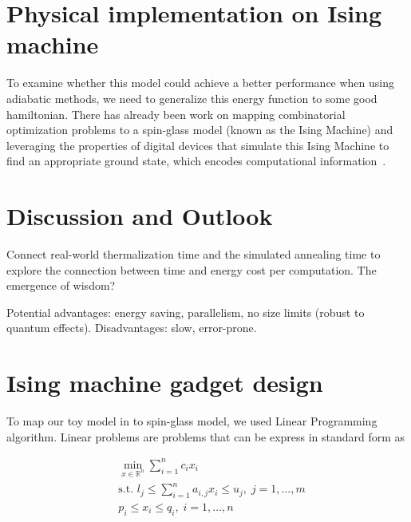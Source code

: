\documentclass[twocolumn,superscriptaddress,english,showpacs,longbibliography]{revtex4-2}
\begin{document}
\section{Physical implementation on Ising machine}\label{spin-glass}

To examine whether this model could achieve a better performance when
using adiabatic methods, we need to generalize this energy function to
some good hamiltonian. There has already been work on mapping
combinatorial optimization problems to a spin-glass model (known as the
Ising Machine) and leveraging the properties of digital devices that
simulate this Ising Machine to find an appropriate ground state, which
encodes computational information~\cite{Aadit2022,Bybee2023}.



\section{Discussion and Outlook}
Connect real-world thermalization time and the simulated annealing time to explore the connection between time and energy cost per computation.
The emergence of wisdom?

Potential advantages: energy saving, parallelism, no size limits (robust to quantum effects). Disadvantages: slow, error-prone.

\begin{acknowledgments}
\end{acknowledgments}

%


\appendix

\section{Ising machine gadget design}\label{sec:gadget-design}
To map our toy model in  to
spin-glass model, we used Linear Programming algorithm.
Linear problems are problems that can be express in standard form as

\begin{equation}
    \begin{split}
        &\min_{x \in \mathbb{R}^n} \sum_{i=1}^n c_ix_i\\
        &\text{s.t. } l_j \leq \sum_{i=1}^n a_{i,j}x_i \leq u_j, \; j=1,\ldots,m\\
        &p_i \leq x_i \leq q_i, \; i=1,\ldots, n
    \end{split}
\end{equation}
\end{document}
